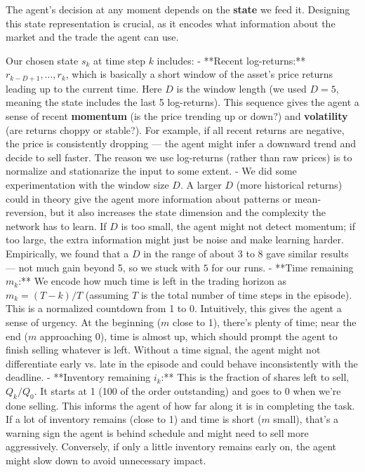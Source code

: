 \documentclass[11pt]{article}
\begin{document}
	
		The agent’s decision at any moment depends on the \textbf{state} we feed it. Designing this state representation is crucial, as it encodes what information about the market and the trade the agent can use.
		
		Our chosen state $s_k$ at time step $k$ includes:
		- **Recent log-returns:** $r_{k-D+1}, \dots, r_{k}$, which is basically a short window of the asset’s price returns leading up to the current time. Here $D$ is the window length (we used $D=5$, meaning the state includes the last 5 log-returns). This sequence gives the agent a sense of recent \textbf{momentum} (is the price trending up or down?) and \textbf{volatility} (are returns choppy or stable?). For example, if all recent returns are negative, the price is consistently dropping — the agent might infer a downward trend and decide to sell faster. The reason we use log-returns (rather than raw prices) is to normalize and stationarize the input to some extent.
		- We did some experimentation with the window size $D$. A larger $D$ (more historical returns) could in theory give the agent more information about patterns or mean-reversion, but it also increases the state dimension and the complexity the network has to learn. If $D$ is too small, the agent might not detect momentum; if too large, the extra information might just be noise and make learning harder. Empirically, we found that a $D$ in the range of about 3 to 8 gave similar results — not much gain beyond 5, so we stuck with $5$ for our runs.
		- **Time remaining $m_k$:** We encode how much time is left in the trading horizon as $m_k = (T-k)/T$ (assuming $T$ is the total number of time steps in the episode). This is a normalized countdown from 1 to 0. Intuitively, this gives the agent a sense of urgency. At the beginning ($m$ close to 1), there’s plenty of time; near the end ($m$ approaching 0), time is almost up, which should prompt the agent to finish selling whatever is left. Without a time signal, the agent might not differentiate early vs. late in the episode and could behave inconsistently with the deadline.
		- **Inventory remaining $i_k$:** This is the fraction of shares left to sell, $Q_k/Q_0$. It starts at 1 (100 of the order outstanding) and goes to 0 when we’re done selling. This informs the agent of how far along it is in completing the task. If a lot of inventory remains (close to 1) and time is short ($m$ small), that’s a warning sign the agent is behind schedule and might need to sell more aggressively. Conversely, if only a little inventory remains early on, the agent might slow down to avoid unnecessary impact.
		
\end{document}
